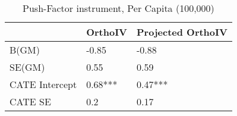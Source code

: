 \begin{table}\centering\caption{Push-Factor instrument, Per Capita (100,000)}\begin{tabular}{lll}
\toprule
                & OrthoIV   & Projected OrthoIV   \\
\midrule
 B(GM)          & -0.85     & -0.88               \\
 SE(GM)         & 0.55      & 0.59                \\
 CATE Intercept & 0.68***   & 0.47***             \\
 CATE SE        & 0.2       & 0.17                \\
\bottomrule
\end{tabular}\end{table}